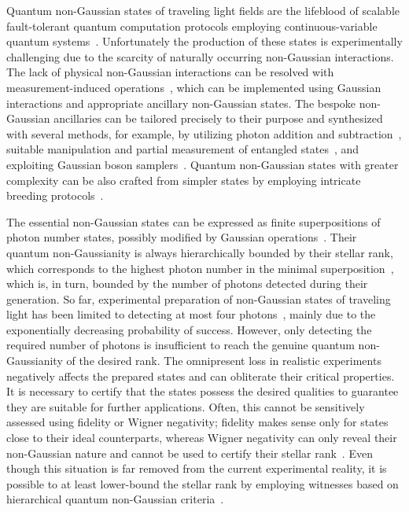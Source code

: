 \documentclass{article}
\begin{document}
Quantum non-Gaussian states of traveling light fields are the lifeblood of scalable fault-tolerant quantum computation protocols employing continuous-variable quantum systems~\cite{lloyd1999,gottesman2001,menicucci2014,baragiola2019,bourassa2021,madsen2022,aghaeerad2025}. Unfortunately the production of these states is experimentally challenging due to the scarcity of naturally occurring non-Gaussian interactions. The lack of physical non-Gaussian interactions can be resolved with measurement-induced operations~\cite{filip2005,marek2009,marek2011,yukawa2013b,miyata2016,marek2018a,sakaguchi2023}, which can be implemented using Gaussian interactions and appropriate ancillary non-Gaussian states. The bespoke non-Gaussian ancillaries can be tailored precisely to their purpose and synthesized with several methods, for example, by utilizing photon addition and subtraction~\cite{dakna1999,fiurasek2005,eaton2019,takase2021,endo2023}, suitable manipulation and partial measurement of entangled states~\cite{yukawa2013a,yoshikawa2018,tiedau2019,provaznik2020}, and exploiting Gaussian boson samplers~\cite{su2019,quesada2019}. Quantum non-Gaussian states with greater complexity can be also crafted from simpler states by employing intricate breeding protocols~\cite{weigand2018,eaton2022,zheng2023,takase2024,aghaeerad2025}.

The essential non-Gaussian states can be expressed as finite superpositions of photon number states, possibly modified by Gaussian operations~\cite{lachman2019,fiurasek2022,walschaers2021,chabaud2020}. Their quantum non-Gaussianity is always hierarchically bounded by their stellar rank, which corresponds to the highest photon number in the minimal superposition~\cite{walschaers2021,lachman2019,fiurasek2022}, which is, in turn, bounded by the number of photons detected during their generation. So far, experimental preparation of non-Gaussian states of traveling light has been limited to detecting at most four photons~\cite{engelkemeier2021,endo2025b}, mainly due to the exponentially decreasing probability of success.
%
However, only detecting the required number of photons is insufficient to reach the genuine quantum non-Gaussianity of the desired rank. The omnipresent loss in realistic experiments negatively affects the prepared states and can obliterate their critical properties. It is necessary to certify that the states possess the desired qualities to guarantee they are suitable for further applications. Often, this cannot be sensitively assessed using fidelity or Wigner negativity; fidelity makes sense only for states close to their ideal counterparts, whereas Wigner negativity can only reveal their non-Gaussian nature and cannot be used to certify their stellar rank~\cite{walschaers2021}. Even though this situation is far removed from the current experimental reality, it is possible to at least lower-bound the stellar rank by employing witnesses based on hierarchical quantum non-Gaussian criteria~\cite{lachman2019,fiurasek2022}.
\end{document}
